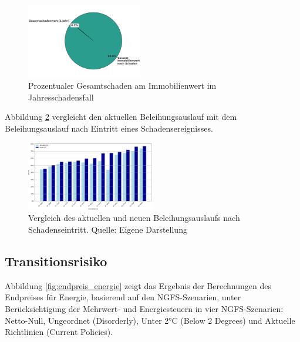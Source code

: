 \begin{figure}[H]
    \centering
    \includegraphics[width=0.45\textwidth]{figures/roundchartloss1year.png}
    \caption{Prozentualer Gesamtschaden am Immobilienwert im Jahresschadensfall}
    \label{fig:schadenereignis_jahr}
\end{figure}


Abbildung \ref{fig:schadenLtV} vergleicht den aktuellen Beleihungsauslauf mit dem Beleihungsauslauf nach Eintritt eines Schadensereignisses.

\begin{figure}[htbp]
    \centering
    \includegraphics[width=0.5\textwidth]{figures/compareltv.png}
    \caption{Vergleich des aktuellen und neuen Beleihungsauslaufs nach Schadenseintritt. Quelle: Eigene Darstellung}
    \label{fig:schadenLtV}
\end{figure}
\FloatBarrier



\subsection{Transitionsrisiko}
Abbildung \ref{fig:endpreis_energie} zeigt das Ergebnis der Berechnungen des Endpreises für Energie, basierend auf den NGFS-Szenarien, unter Berücksichtigung der Mehrwert- und Energiesteuern in vier NGFS-Szenarien: Netto-Null, Ungeordnet (Disorderly), Unter 2°C (Below 2 Degrees) und Aktuelle Richtlinien (Current Policies).

